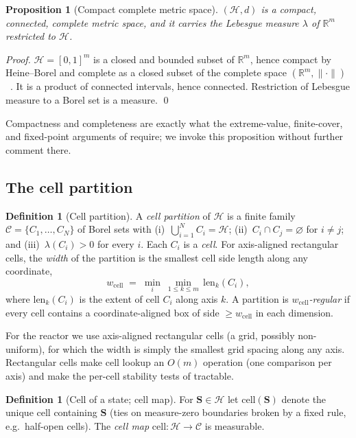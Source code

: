 \documentclass[11pt,a4paper,twocolumn]{article}
\theoremstyle{thmstyle}
\newtheorem{proposition}[theorem]{Proposition}
\theoremstyle{definition}
\newtheorem{definition}[theorem]{Definition}
\theoremstyle{remark}
\newcommand{\R}{\mathbb{R}}
\newcommand{\Hs}{\mathcal{H}}
\newcommand{\Cs}{\mathcal{C}}
\newcommand{\Ss}{\mathbf{S}}
\newcommand{\wcell}{w_{\mathrm{cell}}}
\newcommand{\norm}[1]{\lVert#1\rVert}
\begin{document}
\begin{proposition}[Compact complete metric space]
\label{prop:complete}
$(\Hs,d)$ is a compact, connected, complete metric space, and it carries
the Lebesgue measure $\lambda$ of $\R^m$ restricted to $\Hs$.
\end{proposition}

\begin{proof}
$\Hs=[0,1]^m$ is a closed and bounded subset of $\R^m$, hence compact by
Heine--Borel and complete as a closed subset of the complete space
$(\R^m,\norm{\cdot})$~\citep{munkres2000topology}. It is a product of
connected intervals, hence connected. Restriction of Lebesgue measure to
a Borel set is a measure. \qed
\end{proof}

Compactness and completeness are exactly what the extreme-value,
finite-cover, and fixed-point arguments of  require;
we invoke this proposition without further comment there.

\subsection{The cell partition}

\begin{definition}[Cell partition]
\label{def:cells}
A \emph{cell partition} of $\Hs$ is a finite family
$\Cs=\{C_1,\dots,C_N\}$ of Borel sets with
(i)~$\bigcup_{i=1}^N C_i=\Hs$;
(ii)~$C_i\cap C_j=\varnothing$ for $i\neq j$; and
(iii)~$\lambda(C_i)>0$ for every $i$.
Each $C_i$ is a \emph{cell}. For axis-aligned rectangular cells, the
\emph{width} of the partition is the smallest cell side length along any
coordinate,
\begin{equation}
\label{eq:width}
\wcell\;=\;\min_{i}\ \min_{1\le k\le m}\,\mathrm{len}_k(C_i),
\end{equation}
where $\mathrm{len}_k(C_i)$ is the extent of cell $C_i$ along axis $k$. A
partition is \emph{$\wcell$-regular} if every cell contains a
coordinate-aligned box of side $\ge\wcell$ in each dimension.
\end{definition}

For the reactor we use axis-aligned rectangular cells (a grid, possibly
non-uniform), for which the width is simply the smallest grid spacing
along any axis. Rectangular cells make cell lookup an $O(m)$ operation
(one comparison per axis) and make the per-cell stability tests of
 tractable.

\begin{definition}[Cell of a state; cell map]
\label{def:cellmap}
For $\Ss\in\Hs$ let $\mathrm{cell}(\Ss)$ denote the unique cell containing
$\Ss$ (ties on measure-zero boundaries broken by a fixed rule, e.g.\
half-open cells). The \emph{cell map} $\mathrm{cell}\colon\Hs\to\Cs$ is
measurable.
\end{definition}
\end{document}

